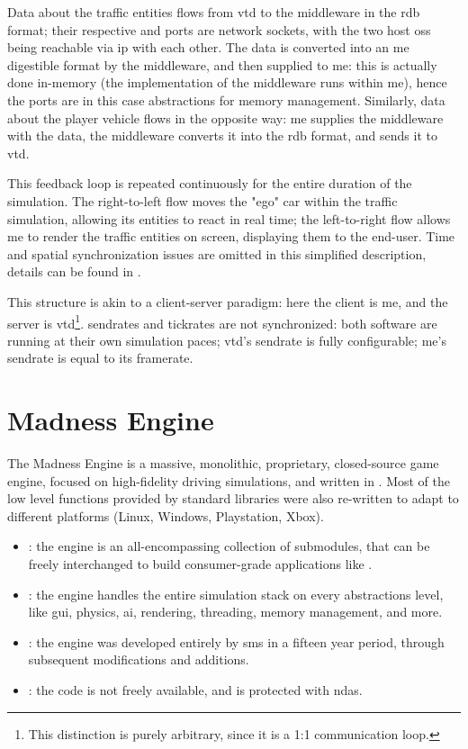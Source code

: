 Data about the traffic entities flows from \gls{vtd} to the \gls{middleware} in the \gls{rdb} format; their respective  and  ports are network sockets, with the two host \glspl{os} being reachable via \gls{ip} with each other. The data is converted into an \gls{me} digestible format by the \gls{middleware}, and then supplied to \gls{me}: this is actually done in-memory (the implementation of the \gls{middleware} runs within \gls{me}), hence the ports are in this case abstractions for memory management. Similarly, data about the player vehicle flows in the opposite way: \gls{me} supplies the \gls{middleware} with the data, the \gls{middleware} converts it into the \gls{rdb} format, and sends it to \gls{vtd}.

This feedback loop is repeated continuously for the entire duration of the simulation. The right-to-left flow moves the "ego" car within the traffic simulation, allowing its entities to react in real time; the left-to-right flow allows \gls{me} to render the traffic entities on screen, displaying them to the end-user. Time and spatial synchronization issues are omitted in this simplified description, details can be found in . %

This structure is akin to a client-server paradigm: here the client is \gls{me}, and the server is \gls{vtd}\footnote{This distinction is purely arbitrary, since it is a 1:1 communication loop.}. \Glspl{sendrate} and \glspl{tickrate} are not synchronized: both software are running at their own simulation paces; \gls{vtd}'s sendrate is fully configurable; \gls{me}'s sendrate is equal to its framerate.

\section{Madness Engine}\label{sc:software:madnessengine}

The Madness Engine is a massive, monolithic, proprietary, closed-source game engine, focused on high-fidelity driving simulations, and written in . Most of the low level functions provided by standard libraries were also re-written to adapt to different platforms (Linux, Windows, Playstation, Xbox).

\begin{itemize}
	\item {}: the engine is an all-encompassing collection of submodules, that can be freely interchanged to build consumer-grade applications like .
	\item {}: the engine handles the entire simulation stack on every abstractions level, like \gls{gui}, physics, \gls{ai}, rendering, threading, memory management, and more.
	\item {}: the engine was developed entirely by \gls{sms} in a fifteen year period, through subsequent modifications and additions.
	\item {}: the code is not freely available, and is protected with \glspl{nda}.
\end{itemize}

